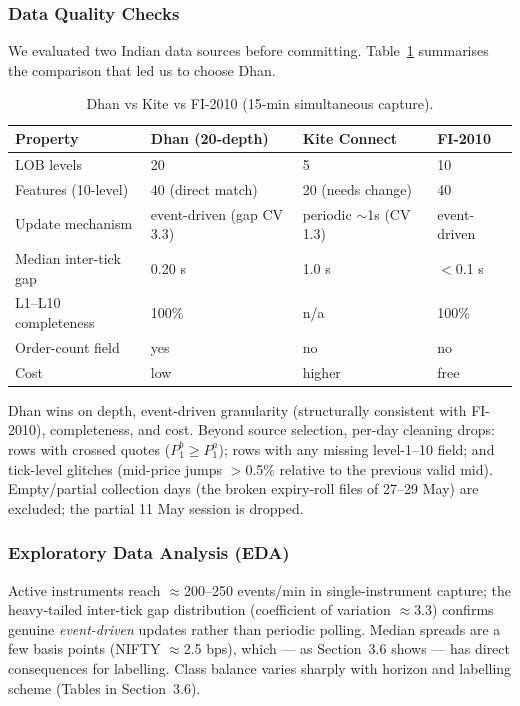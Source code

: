 \documentclass[11pt]{article}
\begin{document}
\subsubsection{Data Quality Checks}
We evaluated two Indian data sources before committing. Table~\ref{tab:dhanvskite} summarises the
comparison that led us to choose Dhan.
\begin{table}[h]
\centering
\caption{Dhan vs Kite vs FI-2010 (15-min simultaneous capture).}
\label{tab:dhanvskite}
\begin{tabular}{@{}llll@{}}
\toprule
Property & Dhan (20-depth) & Kite Connect & FI-2010 \\
\midrule
LOB levels & 20 & 5 & 10 \\
Features (10-level) & 40 (direct match) & 20 (needs change) & 40 \\
Update mechanism & event-driven (gap CV 3.3) & periodic $\sim$1s (CV 1.3) & event-driven \\
Median inter-tick gap & 0.20 s & 1.0 s & $<$0.1 s \\
L1--L10 completeness & 100\% & n/a & 100\% \\
Order-count field & yes & no & no \\
Cost & low & higher & free \\
\bottomrule
\end{tabular}
\end{table}
Dhan wins on depth, event-driven granularity (structurally consistent with FI-2010), completeness, and
cost. Beyond source selection, per-day cleaning drops: rows with crossed quotes ($P^b_1\!\ge\!P^a_1$);
rows with any missing level-1--10 field; and tick-level glitches (mid-price jumps $>$0.5\% relative to the
previous valid mid). Empty/partial collection days (the broken expiry-roll files of 27--29 May) are
excluded; the partial 11 May session is dropped.

\subsubsection{Exploratory Data Analysis (EDA)}
Active instruments reach $\approx$200--250 events/min in single-instrument capture; the heavy-tailed
inter-tick gap distribution (coefficient of variation $\approx$3.3) confirms genuine \emph{event-driven}
updates rather than periodic polling. Median spreads are a few basis points (NIFTY $\approx$2.5 bps),
which --- as Section~3.6 shows --- has direct consequences for labelling. Class balance varies sharply with
horizon and labelling scheme (Tables in Section~3.6).
\end{document}
